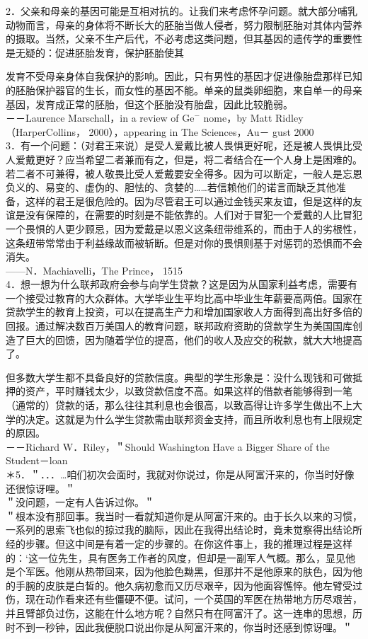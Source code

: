 2．父亲和母亲的基因可能是互相对抗的。让我们来考虑怀孕问题。就大部分哺乳动物而言，母亲的身体将不断长大的胚胎当做人侵者，努力限制胚胎对其体内营养的摄取。当然，父亲不生产后代，不必考虑这类问题，但其基因的遗传学的重要性是无疑的：促进胚胎发育，保护胚胎使其

发育不受母亲身体自我保护的影响。因此，只有男性的基因才促进像胎盘那样已知的胚胎保护器官的生长，而女性的基因不能。单亲的鼠类卵细胞，来自单一的母亲基因，发育成正常的胚胎，但这个胚胎没有胎盘，因此比较脆弱。\\
－－Laurence Marschall，in a review of $\mathrm{Ge}^{-}$ nome，by Matt Ridley（HarperCollins， 2000），appearing in The Sciences，Au－ gust 2000\\
3．有一个问题：（对君王来说）是受人爱戴比被人畏惧更好呢，还是被人畏惧比受人爱戴更好？应当希望二者兼而有之，但是，将二者结合在一个人身上是困难的。若二者不可兼得，被人敬畏比受人爱戴要安全得多。因为可以断定，一般人是忘恩负义的、易变的、虚伪的、胆怯的、贪婪的……若信赖他们的诺言而缺乏其他准备，这样的君王是很危险的。因为尽管君王可以通过金钱买来友谊，但是这样的友谊是没有保障的，在需要的时刻是不能依靠的。人们对于冒犯一个爱戴的人比冒犯一个畏惧的人更少顾忌，因为爱戴是以恩义这条纽带维系的，而由于人的劣根性，这条纽带常常由于利益缘故而被斩断。但是对你的畏惧则基于对惩罚的恐惧而不会消失。\\
——N．Machiavelli，The Prince， 1515\\
4．想一想为什么联邦政府会参与向学生贷款？这是因为从国家利益考虑，需要有一个接受过教育的大众群体。大学毕业生平均比高中毕业生年薪要高两倍。国家在贷款学生的教育上投资，可以在提高生产力和增加国家收人方面得到高出好多倍的回报。通过解决数百万美国人的教育问题，联邦政府资助的贷款学生为美国国库创造了巨大的回馈，因为随着学位的提高，他们的收人及应交的税款，就大大地提高了。

但多数大学生都不具备良好的贷款信度。典型的学生形象是：没什么现钱和可做抵押的资产，平时赚钱太少，以致贷款信度不高。如果这样的借款者能够得到一笔（通常的）贷款的话，那么往往其利息也会很高，以致高得让许多学生做出不上大学的决定。这就是为什么学生贷款需由联邦资金支持，而且所收利息也有上限规定的原因。\\
－－Richard W．Riley，＂Should Washington Have a Bigger Share of the Student－loan\\
＊5．＂．．．…咱们初次会面时，我就对你说过，你是从阿富汗来的，你当时好像还很惊讶哩。＂\\
＂没问题，一定有人告诉过你。＂\\
＂根本没有那回事。我当时一看就知道你是从阿富汗来的。由于长久以来的习惯，一系列的思索飞也似的掠过我的脑际，因此在我得出结论时，竟未觉察得出结论所经的步骤。但这中间是有着一定的步骤的。在你这件事上，我的推理过程是这样的：‘这一位先生，具有医务工作者的风度，但却是一副军人气概。那么，显见他是个军医。他刚从热带回来，因为他脸色黝黑，但那并不是他原来的肤色，因为他的手腕的皮肤是白皙的。他久病初愈而又历尽艰辛，因为他面容憔悴。他左臂受过伤，现在动作看来还有些僵硬不便。试问，一个英国的军医在热带地方历尽艰苦，并且臂部负过伤，这能在什么地方呢？自然只有在阿富汗了。这一连串的思想，历时不到一秒钟，因此我便脱口说出你是从阿富汗来的，你当时还感到惊讶哩。＂

